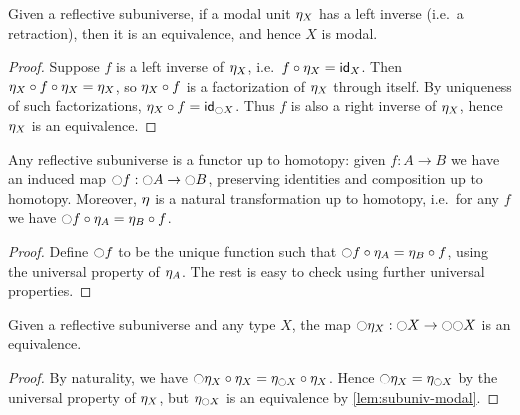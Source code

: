 \begin{lem}\label{thm:modalunit-retract-equiv}
  Given a reflective subuniverse, if a modal unit $\modalunit[X]$ has a left inverse (i.e.\ a retraction), then it is an equivalence, and hence $X$ is modal.
\end{lem}
\begin{proof}
  Suppose $f$ is a left inverse of $\modalunit[X]$, i.e.\ $f\circ \modalunit[X] = \idfunc[X]$.
  Then $\modalunit[X]\circ f\circ \modalunit[X] = \modalunit[X]$, so $\modalunit[X]\circ f$ is a factorization of $\modalunit[X]$ through itself.
  By uniqueness of such factorizations, $\modalunit[X]\circ f = \idfunc[\modal X]$.
  Thus $f$ is also a right inverse of $\modalunit[X]$, hence $\modalunit[X]$ is an equivalence.
\end{proof}

\begin{lem}
  Any reflective subuniverse is a functor up to homotopy: given $f:A\to B$ we have an induced map $\modal f : \modal A \to \modal B$, preserving identities and composition up to homotopy.
  Moreover, $\modalunit$ is a natural transformation up to homotopy, i.e.\ for any $f$ we have $\modal f \circ \modalunit[A] = \modalunit[B] \circ f$.
\end{lem}
\begin{proof}
  Define $\modal f$ to be the unique function such that $\modal f \circ \modalunit[A] = \modalunit[B] \circ f$, using the universal property of $\modalunit[A]$.
  The rest is easy to check using further universal properties.
\end{proof}

\begin{lem}
  Given a reflective subuniverse and any type $X$, the map $\modal \modalunit[X] : \modal X \to \modal\modal X$ is an equivalence.
\end{lem}
\begin{proof}
  By naturality, we have $\modal \modalunit[X] \circ \modalunit[X] = \modalunit[\modal X] \circ \modalunit[X]$.
  Hence $\modal \modalunit[X] = \modalunit[\modal X]$ by the universal property of $\modalunit[X]$, but $\modalunit[\modal X]$ is an equivalence by \cref{lem:subuniv-modal}.
\end{proof}

